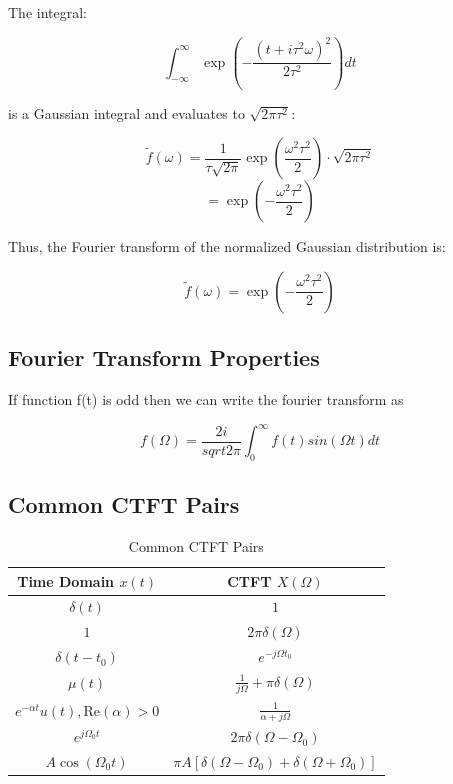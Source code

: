 \documentclass[12pt]{article}
\begin{document}
The integral:

\[ \int_{-\infty}^{\infty} \exp \left( -\frac{(t + i\tau^2 \omega)^2}{2\tau^2} \right) dt \]

is a Gaussian integral and evaluates to \( \sqrt{2\pi \tau^2} \):

\[ \tilde{f}(\omega) = \frac{1}{\tau \sqrt{2\pi}} \exp \left( \frac{\omega^2 \tau^2}{2} \right) \cdot \sqrt{2\pi \tau^2} \]
\[ = \exp \left( -\frac{\omega^2 \tau^2}{2} \right) \]

Thus, the Fourier transform of the normalized Gaussian distribution is:

\[ \tilde{f}(\omega) = \exp \left( -\frac{\omega^2 \tau^2}{2} \right) \]

\subsection{Fourier Transform Properties}

If function f(t) is odd then we can write the fourier transform as 

\[f(\Omega) = \frac{2i}{sqrt{2\pi}}\int_{0}^{\infty} f(t) sin(\Omega t)dt\]

\subsection{Common CTFT Pairs}

\begin{table}[h!]
    \centering
    \begin{tabular}{|c|c|}
        \hline
        \textbf{Time Domain} $x(t)$ & \textbf{CTFT} $X(\Omega)$ \\
        \hline
        $\delta(t)$ & $1$ \\
        \hline
        $1$ & $2\pi \delta(\Omega)$ \\
        \hline
        $\delta(t - t_0)$ & $e^{-j \Omega t_0}$ \\
        \hline
        $\mu(t)$ & $\frac{1}{j\Omega} + \pi \delta(\Omega)$ \\
        \hline
        $e^{-\alpha t} u(t), \text{Re}(\alpha) > 0$ & $\frac{1}{\alpha + j\Omega}$ \\
        \hline
        $e^{j\Omega_0 t}$ & $2\pi \delta(\Omega - \Omega_0)$ \\
        \hline
        $A \cos(\Omega_0 t)$ & $\pi A [\delta(\Omega - \Omega_0) + \delta(\Omega + \Omega_0)]$ \\
        \hline
    \end{tabular}
    \caption{Common CTFT Pairs}
    \label{tab:ctft_pairs}
\end{table}
\end{document}
